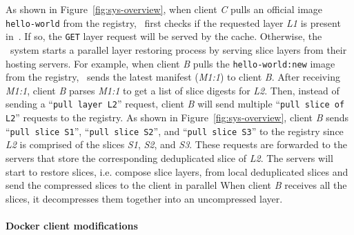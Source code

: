 As shown in Figure~\ref{fig:sys-overview},
when client \textit{C} pulls an official image \texttt{hello-world} from the registry,
\sysname~first checks if the requested layer \textit{L1} is present in~\preconstructcachename.
If so, the \texttt{GET} layer request will be served by the cache.
Otherwise, the \dedupname~system starts a parallel layer restoring process by serving slice layers from their hosting servers.
For example, when client \textit{B} pulls the \texttt{hello-world:new} image from the registry,
\sysname~sends the latest manifest (\textit{M1:1}) to client \textit{B}.
After receiving \textit{M1:1}, client \textit{B} 
parses \textit{M1:1} to get a list of slice digests for \textit{L2}.
Then, instead of sending a ``\texttt{pull layer L2}'' request, client \textit{B} will send multiple ``\texttt{pull slice of L2}'' requests to the registry.
As shown in Figure~\ref{fig:sys-overview}, client \textit{B} sends ``\texttt{pull slice S1}'', ``\texttt{pull slice S2}'', and 
``\texttt{pull slice S3}'' to the registry 
since \textit{L2} is comprised of the slices \textit{S1}, \textit{S2}, and \textit{S3}.
These requests are forwarded to the servers that store the corresponding deduplicated slice of \textit{L2}.
The servers will start to restore slices, i.e. compose slice layers, from local deduplicated slices and send the compressed slices to the client 
in parallel %
When client \textit{B} receives all the slices, it decompresses them together into an uncompressed layer.

\paragraph{Docker client modifications}
 
